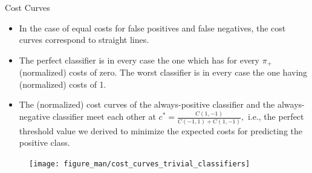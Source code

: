 		\begin{frame}{Cost Curves}
		\footnotesize
		
		\begin{minipage}{0.55\textwidth}
		\begin{itemize}
			\item In the case of equal costs for false positives and false negatives, the cost curves correspond to straight lines. 
			\item The {\color{blue} perfect classifier} is in every case the one which has for every $\pi_+$ (normalized) costs of zero. The worst classifier is in every case the one having (normalized) costs of 1.
%			
			\item The (normalized) cost curves of the {\color{red} always-positive classifier} and the {\color{green} always-negative classifier} meet each other at $c^* = \frac{C(1,-1)}{C(-1,1)+C(1,-1)},$ i.e., the perfect threshold value we derived to minimize the expected costs for predicting the positive class.
		\end{itemize}
			\end{minipage}
			\begin{minipage}{0.4\textwidth}
				\begin{figure}
					\centering
					\texttt{[image: figure\_man/cost\_curves\_trivial\_classifiers]}
				\end{figure}
			\end{minipage}

	\end{frame}
	\endlecture

